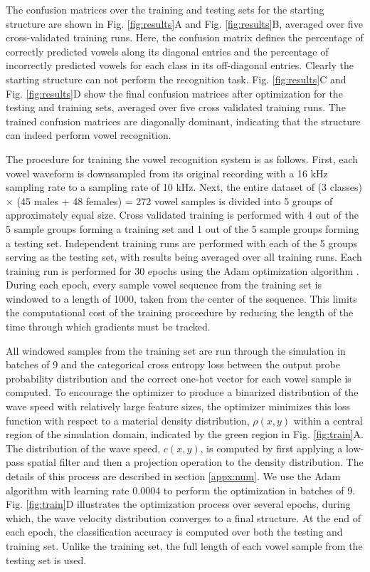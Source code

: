 The confusion matrices over the training and testing sets for the starting structure are shown in Fig. \ref{fig:results}A and Fig. \ref{fig:results}B, averaged over five cross-validated training runs.
Here, the confusion matrix defines the percentage of correctly predicted vowels along its diagonal entries and the percentage of incorrectly predicted vowels for each class in its off-diagonal entries.
Clearly the starting structure can not perform the recognition task.
Fig. \ref{fig:results}C and Fig. \ref{fig:results}D show the final confusion matrices after optimization for the testing and training sets, averaged over five cross validated training runs.
The trained confusion matrices are diagonally dominant, indicating that the structure can indeed perform vowel recognition.


The procedure for training the vowel recognition system is as follows. 
First, each vowel waveform is downsampled from its original recording with a 16 kHz sampling rate to a sampling rate of 10 kHz.
Next, the entire dataset of (3 classes) $\times$ (45 males + 48 females) = 272 vowel samples is divided into 5 groups of approximately equal size.
Cross validated training is performed with 4 out of the 5 sample groups forming a training set and 1 out of the 5 sample groups forming a testing set.
Independent training runs are performed with each of the 5 groups serving as the testing set, with results being averaged over all training runs. 
Each training run is performed for 30 epochs using the Adam optimization algorithm \cite{kingma_adam_2014}. 
During each epoch, every sample vowel sequence from the training set is windowed to a length of 1000, taken from the center of the sequence.
This limits the computational cost of the training proceedure by reducing the length of the time through which gradients must be tracked.

All windowed samples from the training set are run through the simulation in batches of 9 and the categorical cross entropy loss between the output probe probability distribution and the correct one-hot vector for each vowel sample is computed.
To encourage the optimizer to produce a binarized distribution of the wave speed with relatively large feature sizes, the optimizer minimizes this loss function with respect to a material density distribution, $\rho{\left(x,y\right)}$ within a central region of the simulation domain, indicated by the green region in Fig. \ref{fig:train}A. 
The distribution of the wave speed, $c{\left(x,y\right)}$, is computed by first applying a low-pass spatial filter and then a projection operation to the density distribution. 
The details of this process are described in section \ref{appx:num}. 
We use the Adam algorithm \cite{kingma_adam_2014} with learning rate 0.0004 to perform the optimization in batches of 9. 
Fig. \ref{fig:train}D illustrates the optimization process over several epochs, during which, the wave velocity distribution converges to a final structure.
At the end of each epoch, the classification accuracy is computed over both the testing and training set. 
Unlike the training set, the full length of each vowel sample from the testing set is used.

